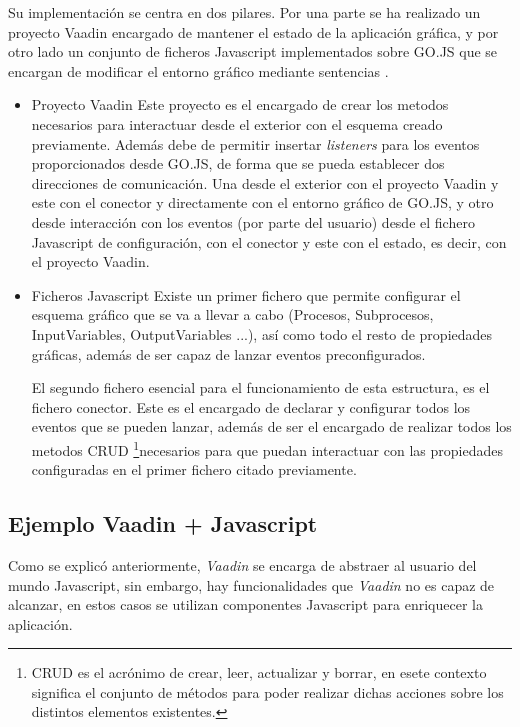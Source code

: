 Su implementación se centra en dos pilares. Por una parte se ha realizado un proyecto Vaadin encargado de mantener el estado de la aplicación gráfica, y por otro lado un conjunto de ficheros Javascript implementados sobre GO.JS que se encargan de modificar el entorno gráfico mediante sentencias .
\begin{itemize}
	\item Proyecto Vaadin
	\subitem Este proyecto es el encargado de crear los metodos necesarios para interactuar desde el exterior con el esquema creado previamente. Además debe de permitir insertar \emph{listeners} para los eventos proporcionados desde GO.JS, de forma que se pueda establecer dos direcciones de comunicación. Una desde el exterior con el proyecto Vaadin y este con el conector y directamente con el entorno gráfico de GO.JS, y otro desde interacción con los eventos (por parte del usuario) desde el fichero Javascript de configuración, con el conector y este con el estado, es decir, con el proyecto Vaadin.
	
	\item Ficheros Javascript
	\subitem Existe un primer fichero que permite configurar el esquema gráfico que se va a llevar a cabo (Procesos, Subprocesos, InputVariables, OutputVariables ...), así como todo el resto de propiedades gráficas, además de ser capaz de lanzar eventos preconfigurados.
	
	
	El segundo fichero esencial para el funcionamiento de esta estructura, es el fichero conector. Este es el encargado de declarar y configurar todos los eventos que se pueden lanzar, además de ser el encargado de realizar todos los metodos CRUD \footnote{CRUD es el acrónimo de crear, leer, actualizar y borrar, en esete contexto significa el conjunto de métodos para poder realizar dichas acciones sobre los distintos elementos existentes.}necesarios para que puedan interactuar con las propiedades configuradas en el primer fichero citado previamente.
\end{itemize}


\subsection{Ejemplo Vaadin + Javascript}

Como se explicó anteriormente, \emph{Vaadin} se encarga de abstraer al usuario del mundo Javascript, sin embargo, hay funcionalidades que \emph{Vaadin} no es capaz de alcanzar, en estos casos se utilizan componentes Javascript para enriquecer la aplicación.

